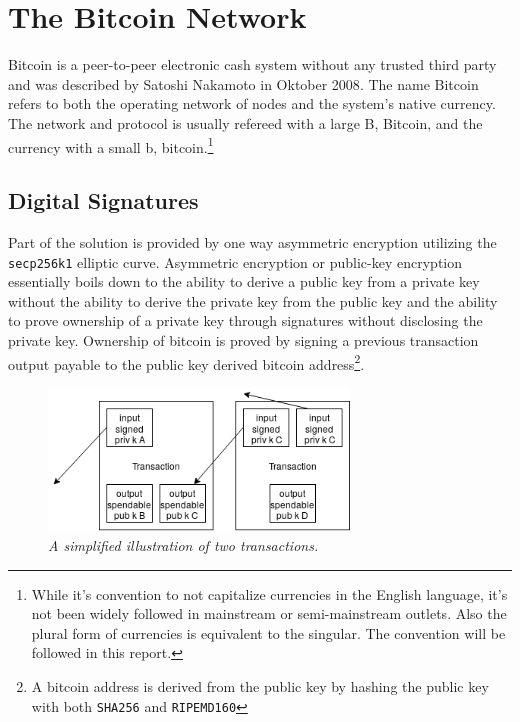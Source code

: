\section{The Bitcoin Network}
	\label{sec:bitcoin}

Bitcoin is a peer-to-peer electronic cash system without any trusted third party and was described by Satoshi Nakamoto in Oktober 2008\cite{nakamoto:bitcoin}. The name Bitcoin refers to both the operating network of nodes and the system's native currency. The network and protocol is usually refereed with a large B, Bitcoin, and the currency with a small b, bitcoin.\footnote{While it's convention to not capitalize currencies in the English language, it's not been widely followed in mainstream or semi-mainstream outlets. Also the plural form of currencies is equivalent to the singular. The convention will be followed in this report.}

\subsection{Digital Signatures}

Part of the solution is provided by one way asymmetric encryption utilizing the \texttt{secp256k1} elliptic curve. Asymmetric encryption or public-key encryption essentially boils down to the ability to derive a public key from a private key without the ability to derive the private key from the public key and the ability to prove ownership of a private key through signatures without disclosing the private key. Ownership of bitcoin is proved by signing a previous transaction output payable to the public key derived bitcoin address\footnote{A bitcoin address is derived from the public key by hashing the public key with both \texttt{SHA256} and \texttt{RIPEMD160}}. 

\begin{figure}[!htb]
	\hspace*{-2cm} 
	\centering
	\includegraphics[width=8cm]{transaction.png}
	\caption{\textit{A simplified illustration of two transactions. 
	}}
	\label{fig:merkle:tree}
	\hspace*{2mm} 	
\end{figure}

